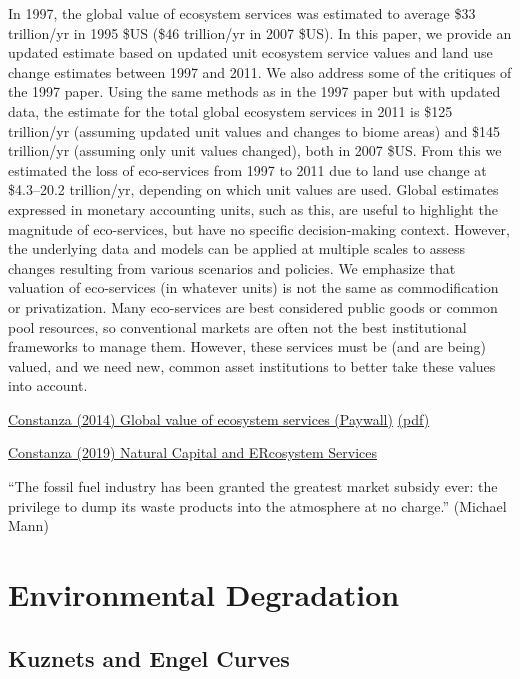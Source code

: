 \documentclass[
]{book}
\begin{document}
In 1997, the global value of ecosystem services was estimated to average \$33 trillion/yr in 1995 \$US (\$46 trillion/yr in 2007 \$US). In this paper, we provide an updated estimate based on updated unit ecosystem service values and land use change estimates between 1997 and 2011. We also address some of the critiques of the 1997 paper. Using the same methods as in the 1997 paper but with updated data, the estimate for the total global ecosystem services in 2011 is \$125 trillion/yr (assuming updated unit values and changes to biome areas) and \$145 trillion/yr (assuming only unit values changed), both in 2007 \$US. From this we estimated the loss of eco-services from 1997 to 2011 due to land use change at \$4.3--20.2 trillion/yr, depending on which unit values are used. Global estimates expressed in monetary accounting units, such as this, are useful to highlight the magnitude of eco-services, but have no specific decision-making context. However, the underlying data and models can be applied at multiple scales to assess changes resulting from various scenarios and policies. We emphasize that valuation of eco-services (in whatever units) is not the same as commodification or privatization. Many eco-services are best considered public goods or common pool resources, so conventional markets are often not the best institutional frameworks to manage them. However, these services must be (and are being) valued, and we need new, common asset institutions to better take these values into account.

\href{https://doi.org/10.1016/j.gloenvcha.2014.04.002}{Constanza (2014) Global value of ecosystem services (Paywall)}
\href{pdf/Costanza_2014_Global_Ecosystem_Services.pdf}{(pdf)}

\href{pdf/Costanza_2019_Natural_Capital_and_Ecosystem_services.pdf}{Constanza (2019) Natural Capital and ERcosystem Services}

``The fossil fuel industry has been granted the greatest market subsidy ever: the privilege to dump its waste products into the atmosphere at no charge.'' (Michael Mann)

\hypertarget{environmental-degradation}{%
\section{Environmental Degradation}\label{environmental-degradation}}

\hypertarget{kuznets-and-engel-curves}{%
\subsection{Kuznets and Engel Curves}\label{kuznets-and-engel-curves}}
\end{document}
